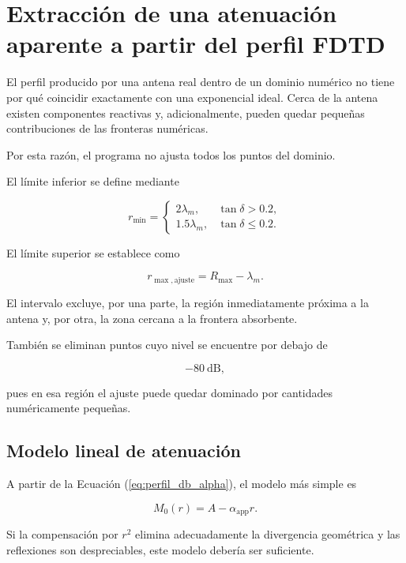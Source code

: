 \section{Extracción de una atenuación aparente a partir del perfil FDTD}

El perfil producido por una antena real dentro de un dominio numérico no tiene por qué coincidir exactamente con una exponencial ideal. Cerca de la antena existen componentes reactivas y, adicionalmente, pueden quedar pequeñas contribuciones de las fronteras numéricas.

Por esta razón, el programa no ajusta todos los puntos del dominio.

El límite inferior se define mediante

\begin{equation}
r_{\min}
=
\begin{cases}
2\lambda_m,
&
\tan\delta>0.2,
\\
1.5\lambda_m,
&
\tan\delta\leq0.2.
\end{cases}
\end{equation}

El límite superior se establece como

\begin{equation}
r_{\max,\mathrm{ajuste}}
=
R_{\max}-\lambda_m.
\end{equation}

El intervalo excluye, por una parte, la región inmediatamente próxima a la antena y, por otra, la zona cercana a la frontera absorbente.

También se eliminan puntos cuyo nivel se encuentre por debajo de

\begin{equation}
-80~\mathrm{dB},
\end{equation}

pues en esa región el ajuste puede quedar dominado por cantidades numéricamente pequeñas.

\subsection{Modelo lineal de atenuación}

A partir de la Ecuación (\ref{eq:perfil_db_alpha}), el modelo más simple es

\begin{equation}
M_0(r)
=
A-\alpha_{\mathrm{app}}r.
\label{eq:M0}
\end{equation}

Si la compensación por $r^2$ elimina adecuadamente la divergencia geométrica y las reflexiones son despreciables, este modelo debería ser suficiente.


